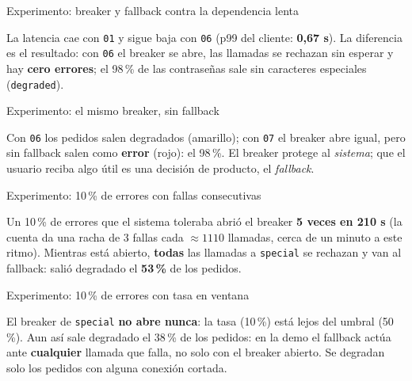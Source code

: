 \documentclass[institutional,screen,none]{ua-engineering-v6-beamer}
\begin{document}
\begin{frame}{Experimento: breaker y fallback contra la dependencia lenta}

{\footnotesize La latencia cae con \texttt{01} y sigue baja con \texttt{06} (p99 del cliente: \textbf{0,67 s}). La diferencia es el resultado: con \texttt{06} el breaker se abre, las llamadas se rechazan sin esperar y hay \textbf{cero errores}; el 98\,\% de las contraseñas sale sin caracteres especiales (\texttt{degraded}).}
\end{frame}

\begin{frame}{Experimento: el mismo breaker, sin fallback}

{\footnotesize Con \texttt{06} los pedidos salen degradados (amarillo); con \texttt{07} el breaker abre igual, pero sin fallback salen como \textbf{error} (rojo): el 98\,\%. El breaker protege al \emph{sistema}; que el usuario reciba algo útil es una decisión de producto, el \emph{fallback}.}
\end{frame}

\begin{frame}{Experimento: 10\,\% de errores con fallas consecutivas}

{\footnotesize Un 10\,\% de errores que el sistema toleraba abrió el breaker \textbf{5 veces en 210 s} (la cuenta da una racha de 3 fallas cada $\approx 1110$ llamadas, cerca de un minuto a este ritmo). Mientras está abierto, \textbf{todas} las llamadas a \texttt{special} se rechazan y van al fallback: salió degradado el \textbf{53\,\%} de los pedidos.}
\end{frame}

\begin{frame}{Experimento: 10\,\% de errores con tasa en ventana}

{\footnotesize El breaker de \texttt{special} \textbf{no abre nunca}: la tasa (10\,\%) está lejos del umbral (50\,\%). Aun así sale degradado el 38\,\% de los pedidos: en la demo el fallback actúa ante \textbf{cualquier} llamada que falla, no solo con el breaker abierto. Se degradan solo los pedidos con alguna conexión cortada.}
\end{frame}
\end{document}
